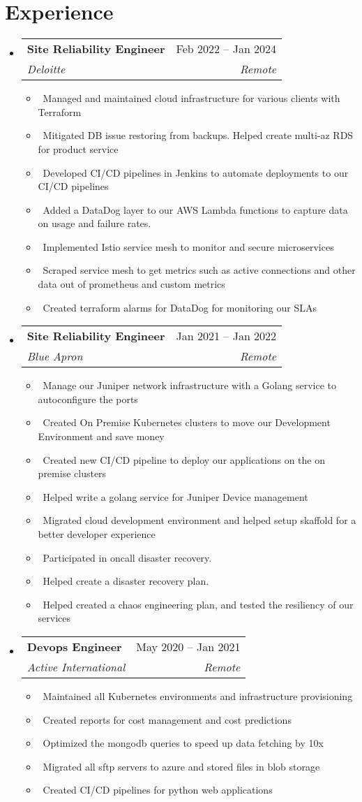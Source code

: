 \documentclass[letterpaper,10pt]{article}
\makeatletter
\newcommand{\resumeItem}[1]{\item\small{#1}}
\newcommand{\resumeSubheading}[4]{
\vspace{-1pt}\item
  \begin{tabular*}{0.97\textwidth}[t]{l@{\extracolsep{\fill}}r}
    \textbf{#1} & #2 \\
    \textit{#3} & \textit{#4} \\
  \end{tabular*}\vspace{-7pt}
}
\newcommand{\resumeSubHeadingList}{\begin{itemize}[leftmargin=0.15in, label={}]}
\newcommand{\resumeSubHeadingListEnd}{\end{itemize}}
\makeatother
\begin{document}
\section{Experience}
\resumeSubHeadingList
  \resumeSubheading
      {Site Reliability Engineer}{Feb 2022 -- Jan 2024}
      {Deloitte}{Remote}
      \resumeSubHeadingList
          \resumeItem{\textbullet\ Managed and maintained cloud infrastructure for various clients with Terraform}
          \resumeItem{\textbullet\ Mitigated DB issue restoring from backups. Helped create multi-az RDS for product service}
          \resumeItem{\textbullet\ Developed CI/CD pipelines in Jenkins to automate deployments to our CI/CD pipelines}
          \resumeItem{\textbullet\ Added a DataDog layer to our AWS Lambda functions to capture data on usage and failure rates.}
          \resumeItem{\textbullet\ Implemented Istio service mesh to monitor and secure microservices}
          \resumeItem{\textbullet\ Scraped service mesh to get metrics such as active connections and other data out of prometheus and custom metrics}
          \resumeItem{\textbullet\ Created terraform alarms for DataDog for monitoring our SLAs}
      \resumeSubHeadingListEnd
  \resumeSubheading
      {Site Reliability Engineer}{Jan 2021 -- Jan 2022}
      {Blue Apron}{Remote}
      \resumeSubHeadingList
          \resumeItem{\textbullet\ Manage our Juniper network infrastructure with a Golang service to autoconfigure the ports}
          \resumeItem{\textbullet\ Created On Premise Kubernetes clusters to move our Development Environment and save money}
          \resumeItem{\textbullet\ Created new CI/CD pipeline to deploy our applications on the on premise clusters}
          \resumeItem{\textbullet\ Helped write a golang service for Juniper Device management}
          \resumeItem{\textbullet\ Migrated cloud development environment and helped setup skaffold for a better developer experience}
          \resumeItem{\textbullet\ Participated in oncall disaster recovery.}
          \resumeItem{\textbullet\ Helped create a disaster recovery plan.}
          \resumeItem{\textbullet\ Helped created a chaos engineering plan, and tested the resiliency of our services}
      \resumeSubHeadingListEnd
      \resumeSubheading
      {Devops Engineer}{May 2020 -- Jan 2021}
      {Active International}{Remote}
      \resumeSubHeadingList
          \resumeItem{\textbullet\ Maintained all Kubernetes environments and infrastructure provisioning}
          \resumeItem{\textbullet\ Created reports for cost management and cost predictions}
          \resumeItem{\textbullet\ Optimized the mongodb queries to speed up data fetching by 10x}
          \resumeItem{\textbullet\ Migrated all sftp servers to azure and stored files in blob storage}
          \resumeItem{\textbullet\ Created CI/CD pipelines for python web applications}
      \resumeSubHeadingListEnd
\resumeSubHeadingListEnd
\end{document}
